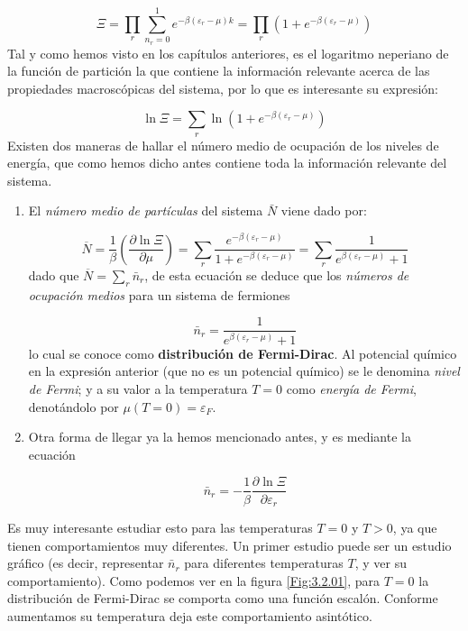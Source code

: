 \documentclass[12pt,a4paper]{article}
\numberwithin{equation}{section}
\numberwithin{figure}{section}
\newcommand{\parentesis}[1]{\left( #1  \right)}
\newcommand{\parciales}[2]{\frac{\partial #1}{\partial #2}}
\newcommand{\pparciales}[2]{\parentesis{\parciales{#1}{#2}}}
\theoremstyle{definition}
\begin{document}
\begin{equation}
\Xi = \prod_r \sum_{n_r=0}^{1} e^{-\beta (\varepsilon_r - \mu)k} = \prod_r \parentesis{1+e^{-\beta (\varepsilon_r - \mu)}}
\end{equation}
Tal y como hemos visto en los capítulos anteriores, es el logaritmo neperiano de la función de partición la que contiene la información relevante acerca de las propiedades macroscópicas del sistema, por lo que es interesante su expresión:

\begin{equation}
\ln \Xi = \sum_r \ln \parentesis{1+e^{-\beta (\varepsilon_r-\mu)}}
\end{equation}
Existen dos maneras de hallar el número medio de ocupación de los niveles de energía, que como hemos dicho antes contiene toda la información relevante del sistema. 

\begin{enumerate}
\item El \textit{número medio de partículas} del sistema $\bar{N}$ viene dado por:

\begin{equation}
\overline{N} = \frac{1}{\beta} \pparciales{\ln \Xi}{\mu}  = \sum_r \frac{e^{-\beta (\varepsilon_r - \mu)}}{1+e^{-\beta (\varepsilon_r - \mu)}} = \sum_r \frac{1}{e^{\beta (\varepsilon_r - \mu)}+1} 
\end{equation}
dado que $\overline{N}=\sum_r \bar{n}_r$, de esta ecuación se deduce que los \textit{números de ocupación medios} para un sistema de fermiones

\begin{equation}
\bar{n}_r = \frac{1}{e^{\beta (\varepsilon_r - \mu)}+1}
\end{equation}
lo cual se conoce como \textbf{distribución de Fermi-Dirac}. Al potencial químico en la expresión anterior (que no es un potencial químico) se le denomina \textit{nivel de Fermi}; y a su valor a la temperatura $T=0$ como \textit{energía de Fermi}, denotándolo por $\mu (T=0) = \varepsilon_F$. 

\item Otra forma de llegar ya la hemos mencionado antes, y es mediante la ecuación

\begin{equation}
\bar{n}_r = - \frac{1}{\beta} \parciales{\ln\Xi}{\varepsilon_r}
\end{equation} 
\end{enumerate}
Es muy interesante estudiar esto para las temperaturas $T=0$ y $T>0$, ya que tienen comportamientos muy diferentes. Un primer estudio puede ser un estudio gráfico (es decir, representar $\bar{n}_r$ para diferentes temperaturas $T$, y ver su comportamiento). Como podemos ver en la figura \ref{Fig:3.2.01}, para $T=0$ la distribución de Fermi-Dirac se comporta como una función escalón. Conforme aumentamos su temperatura deja este comportamiento asintótico.  \\
\end{document}
